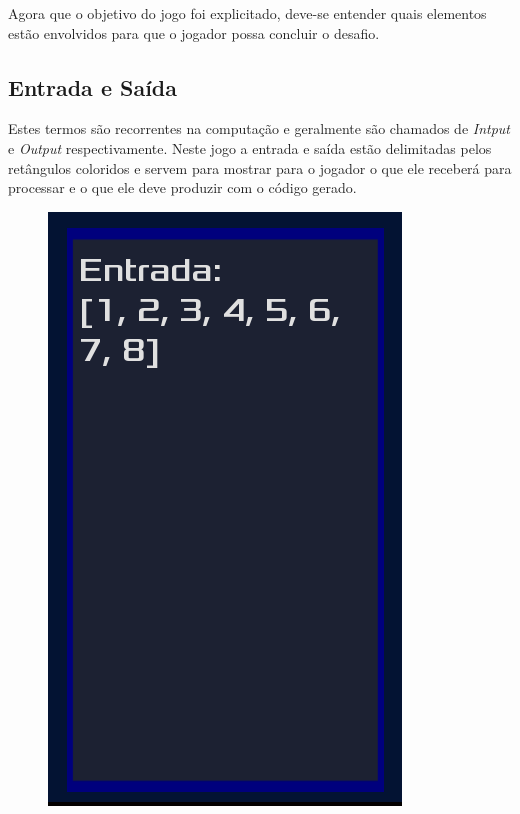 Agora que o objetivo do jogo foi explicitado, deve-se entender quais elementos 
estão envolvidos para que o jogador possa concluir o desafio.

\subsection{Entrada e Saída}

Estes termos são recorrentes na computação e geralmente são chamados de
\textit{Intput} e \textit{Output} respectivamente. Neste jogo a entrada e saída
estão delimitadas pelos retângulos coloridos e servem para mostrar para o 
jogador o que ele receberá para processar e o que ele deve produzir com o código
gerado.

\begin{figure}[H]
    \centering
    \begin{minipage}{.4\textwidth}
      \centering
      \includegraphics[scale=0.3]{../figuras/exemplo_entrada.png}
    \end{minipage}%
    \begin{minipage}{.4\textwidth}
      \centering

\end{minipage}
\end{figure}
